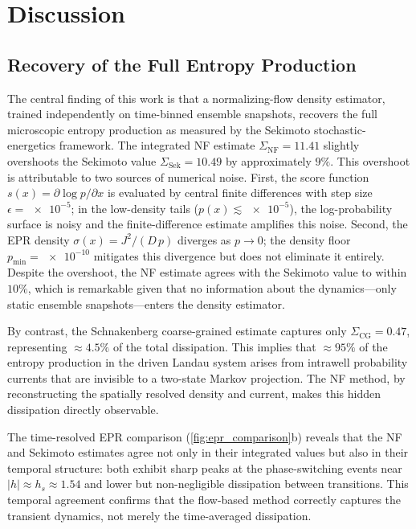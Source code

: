
\section{Discussion}
\label{sec:discussion}

\subsection{Recovery of the Full Entropy Production}

The central finding of this work is that a normalizing-flow density estimator, trained independently on time-binned ensemble snapshots, recovers the full microscopic entropy production as measured by the Sekimoto stochastic-energetics framework.
The integrated NF estimate $\Sigma_{\mathrm{NF}} = \num{11.41}$ slightly overshoots the Sekimoto value $\Sigma_{\mathrm{Sek}} = \num{10.49}$ by approximately $\num{9}\%$.
This overshoot is attributable to two sources of numerical noise.
First, the score function $s(x) = \partial\log p/\partial x$ is evaluated by central finite differences with step size $\epsilon = \num{e-5}$; in the low-density tails ($p(x) \lesssim \num{e-5}$), the log-probability surface is noisy and the finite-difference estimate amplifies this noise.
Second, the EPR density $\sigma(x) = J^2/(D\,p)$ diverges as $p \to 0$; the density floor $p_{\min} = \num{e-10}$ mitigates this divergence but does not eliminate it entirely.
Despite the overshoot, the NF estimate agrees with the Sekimoto value to within $\num{10}\%$, which is remarkable given that no information about the dynamics---only static ensemble snapshots---enters the density estimator.

By contrast, the Schnakenberg coarse-grained estimate captures only $\Sigma_{\mathrm{CG}} = \num{0.47}$, representing $\approx\num{4.5}\%$ of the total dissipation.
This implies that $\approx\num{95}\%$ of the entropy production in the driven Landau system arises from intrawell probability currents that are invisible to a two-state Markov projection.
The NF method, by reconstructing the spatially resolved density and current, makes this hidden dissipation directly observable.

The time-resolved EPR comparison (\cref{fig:epr_comparison}b) reveals that the NF and Sekimoto estimates agree not only in their integrated values but also in their temporal structure: both exhibit sharp peaks at the phase-switching events near $|h| \approx h_s \approx 1.54$ and lower but non-negligible dissipation between transitions.
This temporal agreement confirms that the flow-based method correctly captures the transient dynamics, not merely the time-averaged dissipation.

